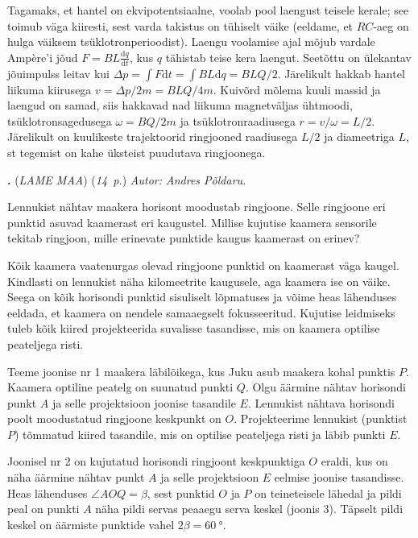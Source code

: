 \documentclass[12pt,a5paper]{article}
\newcommand{\numb}[1]{\vspace{5pt}\textbf{\large #1}}
\newcommand{\nimi}[1]{(\textsl{\small #1})}
\newcommand{\punktid}[1]{(\emph{#1~p.})}
\newcommand{\autor}[1]{\emph{ Autor: #1.}}
\newcounter{ylesanne}
\newcommand{\yl}[1]{\addtocounter{ylesanne}{1}\numb{\theylesanne.} \nimi{#1} \newblock{}}
\begin{document}
Tagamaks, et hantel on ekvipotentsiaalne, voolab pool laengust teisele kerale; see toimub väga kiiresti, sest varda takistus on tühiselt väike (eeldame, et $RC$-aeg on hulga väiksem tsüklotronperioodist). Laengu voolamise ajal mõjub vardale Ampère'i jõud $F=BL\frac {\mathrm d q}{\mathrm dt}$, kus $q$ tähistab teise kera laengut. Seetõttu on ülekantav jõuimpulss leitav kui $\Delta p=\int F\mathrm dt=\int BL\mathrm dq = BLQ/2$. Järelikult hakkab hantel liikuma kiirusega $v=\Delta p/2m=BLQ/4m$. Kuivõrd mõlema kuuli massid ja laengud on samad, siis hakkavad nad liikuma magnetväljas ühtmoodi, tsüklotronsagedusega $\omega=BQ/2m$ ja tsüklotronraadiusega $r=v/\omega=L/2$. Järelikult on kuulikeste trajektoorid ringjooned raadiusega $L/2$ ja diameetriga $L$, st tegemist on kahe üksteist puudutava ringjoonega.



\yl{LAME MAA} \punktid{14} \autor{Andres Põldaru}

Lennukist nähtav maakera horisont moodustab ringjoone. Selle ringjoone eri punktid asuvad kaamerast eri kaugustel. Millise kujutise kaamera sensorile tekitab ringjoon, mille erinevate punktide kaugus kaamerast on erinev?

Kõik kaamera vaatenurgas olevad ringjoone punktid on kaamerast väga kaugel. Kindlasti on lennukist näha kilomeetrite kaugusele, aga kaamera ise on väike. Seega on kõik horisondi punktid sisuliselt lõpmatuses ja võime heas lähenduses eeldada, et kaamera on nendele samaaegselt fokusseeritud. Kujutise leidmiseks tuleb kõik kiired projekteerida suvalisse tasandisse, mis on kaamera optilise peateljega risti.

Teeme joonise nr 1 maakera läbilõikega, kus Juku asub maakera kohal punktis $P$. Kaamera optiline peatelg on suunatud punkti $Q$. Olgu äärmine nähtav horisondi punkt $A$ ja selle projektsioon joonise tasandile $E$. Lennukist nähtava horisondi poolt moodustatud ringjoone keskpunkt on $O$. Projekteerime lennukist (punktist $P$) tõmmatud kiired tasandile, mis on optilise peateljega risti ja läbib punkti $E$.

Joonisel nr 2 on kujutatud horisondi ringjoont keskpunktiga $O$ eraldi, kus on näha äärmine nähtav punkt $A$ ja selle projektsioon $E$ eelmise joonise tasandisse. Heas lähenduses $\angle AOQ = \beta$, sest punktid $O$ ja $P$ on teineteisele lähedal ja pildi peal on punkti $A$ näha pildi servas peaaegu serva keskel (joonis 3). Täpselt pildi keskel on äärmiste punktide vahel $2\beta = \SI{60}{\degree}$.
\end{document}
